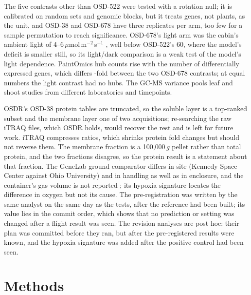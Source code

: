\documentclass{npjlayout}
\begin{document}
The five contrasts other than OSD-522 were tested with a rotation null;
it is calibrated on random sets and genomic blocks, but it treats genes, not plants, as the unit,
and OSD-38 and OSD-678 have three replicates per arm, too few for a sample permutation to reach
significance. OSD-678's light arm was
the cabin's ambient light of 4--6\,$\mu$mol\,m$^{-2}$\,s$^{-1}$ \citep{osd678}, well below OSD-522's
60, where the model's deficit is smaller still, so its light/dark comparison is a weak test of the
model's light dependence. PaintOmics hub counts rise with the number of
differentially expressed genes, which differs \ratioDE-fold between the two OSD-678 contrasts; at
equal numbers the light contrast had no hubs.
The GC-MS variance pools leaf and shoot studies from different laboratories and timepoints.

OSDR's OSD-38 protein tables are truncated, so the soluble layer is a top-ranked subset and the
membrane layer one of two acquisitions; re-searching the raw iTRAQ files, which OSDR holds, would
recover the rest and is left for future work. iTRAQ compresses ratios, which shrinks protein fold
changes but should not reverse them. The membrane fraction is a 100{,}000\,$g$ pellet rather than
total protein, and the two fractions disagree, so the protein result is a statement about that
fraction. The GeneLab ground comparator differs in site (Kennedy Space Center against Ohio
University) and in handling as well as in enclosure, and the container's gas volume is not
reported \citep{osd38,basu2017}; its hypoxia signature locates the difference in oxygen but not its
cause. The pre-registration was written by the same analyst on the same day as the tests, after
the reference had been built; its value lies in the commit order, which shows that no prediction or
setting was changed after a flight result was seen. The revision analyses are post hoc: their plan
was committed before they ran, but after the pre-registered results were known, and the hypoxia
signature was added after the positive control had been seen.

\section{Methods}\label{sec:methods}
\end{document}
